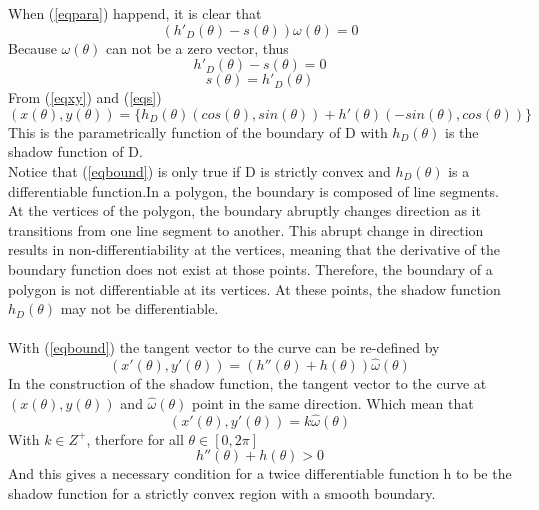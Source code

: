 \documentclass[a4paper]{article}
\begin{document}
When (\ref{eqpara}) happend, it is clear that 
\begin{equation*}
    (h'_D(\theta) - s(\theta))\omega(\theta) = 0
\end{equation*}
Because $\omega(\theta)$ can not be a zero vector, thus
\begin{equation*}
    h'_D(\theta) - s(\theta) = 0
\end{equation*}
\begin{equation}\label{eqs}
    s(\theta) = h'_D(\theta) 
\end{equation}
From (\ref{eqxy}) and (\ref{eqs})
\begin{equation}\label{eqbound}
    (x(\theta),y(\theta)) = \{h_D(\theta)(cos(\theta),sin(\theta)) + h'(\theta)(-sin(\theta),cos(\theta))\}
\end{equation}
This is the parametrically function of the boundary of D with $h_D(\theta)$ is the shadow function of D.\\

\noindent Notice that (\ref{eqbound}) is only true if D is strictly convex and $h_D(\theta)$ is a differentiable function.In a polygon, the boundary is composed of line segments. At the vertices of the polygon, the boundary abruptly changes direction as it transitions from one line segment to another. This abrupt change in direction results in non-differentiability at the vertices, meaning that the derivative of the boundary function does not exist at those points. Therefore, the boundary of a polygon is not differentiable at its vertices. At these points, the shadow function $h_D(\theta)$ may not be differentiable.\\ \\
With (\ref{eqbound}) the tangent vector to the curve can be re-defined by
\begin{equation*}
    (x'(\theta),y'(\theta)) = (h''(\theta) + h(\theta))\hat{\omega}(\theta)
\end{equation*}
In the construction of the shadow function, the tangent vector to the curve at $(x(\theta),y(\theta))$ and $\hat{\omega}(\theta)$ point in the same direction. Which mean that
\begin{equation*}
    (x'(\theta),y'(\theta)) = k \hat{\omega}(\theta)
\end{equation*}
With $k \in Z^+$, therfore for all $\theta \in [0,2\pi]$
\begin{equation}\label{seconddiff}
    h''(\theta) + h(\theta) > 0
\end{equation}
And this gives a necessary condition for a twice differentiable function h to be the shadow function for a strictly convex region with a smooth boundary. 
\end{document}
